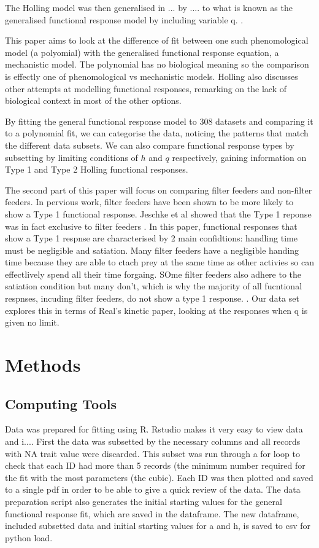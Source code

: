 \documentclass[11pt, a4paper, titlepage]{article}
\begin{document}
The Holling model was then generalised in ... 
by .... to what is known as the generalised functional response model by including variable q. . 

This paper aims to look at the difference of fit between one such phenomological model (a polyomial) with the generalised functional response equation, a mechanistic model. The polynomial has no biological meaning so the comparison is effectly one of phenomological vs mechanistic models. 
Holling also discusses other attempts at modelling functional responses, remarking on the lack of biological context in most of the other options. \parencite{Holling1965}

By fitting the general functional response model to 308 datasets and comparing it to a polynomial fit, we can categorise the data, noticing the patterns that match the different data subsets. We can also compare functional response types by subsetting by limiting conditions of $h$ and $q$ respectively, gaining information on Type 1 and Type 2 Holling functional responses.

The second part of this paper will focus on comparing filter feeders and non-filter feeders. In pervious work, filter feeders have been shown to be more likely to show a Type 1 functional response. Jeschke et al showed that the Type 1 reponse was in fact exclusive to filter feeders \parencite{Jeschke2004}. In this paper, functional responses that show a Type 1 respnse are characterised by 2 main confidtions: handling time must be negligible and satiation. Many filter feeders have a negligible handing time because they are able to ctach prey at the same time as other activies so can effectlively spend all their time forgaing. SOme filter feeders also adhere to the satiation condition but many don't, which is why the majority of all fucntional respnses, incuding filter feeders, do not show a type 1 response. \parencite{Jeschke2004}. Our data set explores this in terms of Real's kinetic paper, looking at the responses when q is given no limit. \parencite{Real1977}

\section{Methods}

\subsection{Computing Tools}

Data was prepared for fitting using R. Rstudio makes it very easy to view data and i.... First the data was subsetted by the necessary columns and all records with NA trait value were discarded. This subset was run through a for loop to check that each ID had more than 5 records (the minimum number required for the fit with the most parameters (the cubic). Each ID was then plotted and saved to a single pdf in order to be able to give a quick review of the data. The data preparation script also generates the initial starting values for the general functional response fit, which are saved in the dataframe. The new dataframe, included subsetted data and initial starting values for a and h, is saved to csv for python load.
\end{document}
